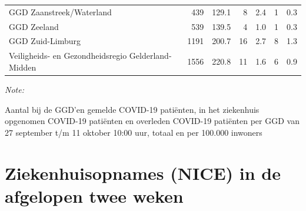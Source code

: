 \documentclass[
  english,
  man,floatsintext]{apa6}
\begin{document}
\begin{table}
\begin{threeparttable}
\begin{tabular}{lrrrrrr}
GGD Zaanstreek/Waterland & 439 & 129.1 & 8 & 2.4 & 1 & 0.3\\
GGD Zeeland & 539 & 139.5 & 4 & 1.0 & 1 & 0.3\\
GGD Zuid-Limburg & 1191 & 200.7 & 16 & 2.7 & 8 & 1.3\\
Veiligheids- en Gezondheidsregio Gelderland-Midden & 1556 & 220.8 & 11 & 1.6 & 6 & 0.9\\
\bottomrule
\end{tabular}
\begin{tablenotes}
\item \textit{Note: } 
\item Aantal bij de GGD’en gemelde COVID-19 patiënten, in het ziekenhuis opgenomen COVID-19 patiënten en overleden COVID-19 patiënten per GGD van 27 september t/m 11 oktober 10:00 uur, totaal en per 100.000 inwoners
\end{tablenotes}
\end{threeparttable}
\endgroup{}
\end{table}

\newpage

\hypertarget{ziekenhuisopnames-nice-in-de-afgelopen-twee-weken}{%
\section{Ziekenhuisopnames (NICE) in de afgelopen twee weken}\label{ziekenhuisopnames-nice-in-de-afgelopen-twee-weken}}
\end{document}
